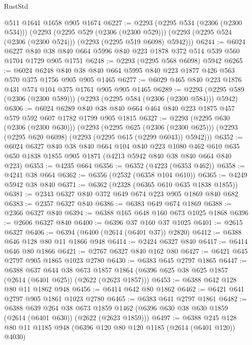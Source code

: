 \begin{lexlean}{RustStd}
\begin{coremodule}
    @511
    @1641
    @1658
    @905
    @1674
@6227 := @2293
    (@2295 @534 (@2306 (@2300 @534)))
    (@2293
      (@2295 @529 (@2306 (@2300 @529)))
      (@2293 (@2295 @524 (@2306 (@2300 @524))) (@2293 (@2295 @519 @6098) @5942)))
@6244 := @6024
    @6227
    @840
    @38
    @840
    @664
    @5996
    @840
    @223
    @1878
    @372
    @514
    @539
    @560
    @1704
    @1729
    @905
    @1751
@6248 := @2293 (@2295 @568 @6098) @5942
@6265 := @6024
    @6248
    @840
    @38
    @840
    @664
    @5995
    @840
    @223
    @1877
    @426
    @563
    @570
    @375
    @1756
    @905
    @905
    @1465
@6277 := @6029 @465 @840 @223 @1876 @431 @574 @104 @375 @1761 @905 @905 @1465
@6289 := @2293 (@2295 @589 (@2306 (@2300 @589))) (@2293 (@2295 @584 (@2306 (@2300 @584))) @5942)
@6306 := @6024
    @6289
    @840
    @38
    @840
    @664
    @464
    @840
    @223
    @1875
    @457
    @579
    @592
    @607
    @1782
    @1799
    @905
    @1815
@6327 := @2293
    (@2295 @630 (@2306 (@2300 @630)))
    (@2293
      (@2295 @625 (@2306 (@2300 @625)))
      (@2293 (@2295 @620 @6098) (@2293 (@2295 @615 (@2299 @6043)) @5942)))
@6352 := @6024
    @6327
    @840
    @38
    @840
    @664
    @104
    @840
    @223
    @1080
    @462
    @610
    @635
    @650
    @1838
    @1855
    @905
    @1871
    (@4213 @5942 @840 @38 @840 @664 @840 @223)
@6353 := @4235 @664
@6356 := @6352 (@4223 (@6353 @462))
@6358 := @4241 @38 @664
@6362 := @6356 (@2532 (@6358 @104 @610))
@6365 := @4249 @5942 @38 @840
@6371 := @6362 (@2328 (@6365 @610 @635 @1838 @1855))
@6381 := @2343 @6327 @840 @372 @649 @674 @223 @905 @1869 @840 @682
@6383 := @2357 @6327 @840
@6386 := @6383 @649 @674 @1869
@6388 := @2366 @6327 @840
@6394 := @6388 @165 @648 @160 @673 @1025 @1868
@6396 := @2606 @6327 @840
@6400 := @6396 @37 @160 @37 @1025
@6401 := @2615 @6327
@6406 := @6394 (@6400 (@2614 (@6401 @37)) @2820)
@6412 := @6388 @646 @128 @80 @11 @1866 @948
@6414 := @2424 @6327 @840
@6417 := @6414 @646 @80 @1866
@6421 := @2767 @6327 @840 @162 @80
@6427 := @6421 @645 @2797 @905 @1865 @1023 @2780
@6430 := @6383 @645 @2797 @1865
@6447 := @6388
    @637
    @644
    @38
    @673
    @1857
    @1864
    (@6396 @625 @38 @625 @1857 (@2614 (@6401 @625)) (@2622 (@2623 @1857)))
@6453 := @6388 @642 @128 @80 @11 @1862 @948
@6456 := @6414 @642 @80 @1862
@6462 := @6421 @641 @2797 @905 @1861 @1023 @2780
@6465 := @6383 @641 @2797 @1861
@6482 := @6388
    @639
    @264
    @38
    @673
    @1859
    @1462
    (@6396 @630 @38 @630 @1859 (@2614 (@6401 @630)) (@2622 (@2623 @1859)))
@6497 := @6388 @245 @128 @80 @11 @1185 @948 (@6396 @120 @80 @120 @1185 (@2614 (@6401 @120)) @4030)

\end{coremodule}
\end{lexlean}

